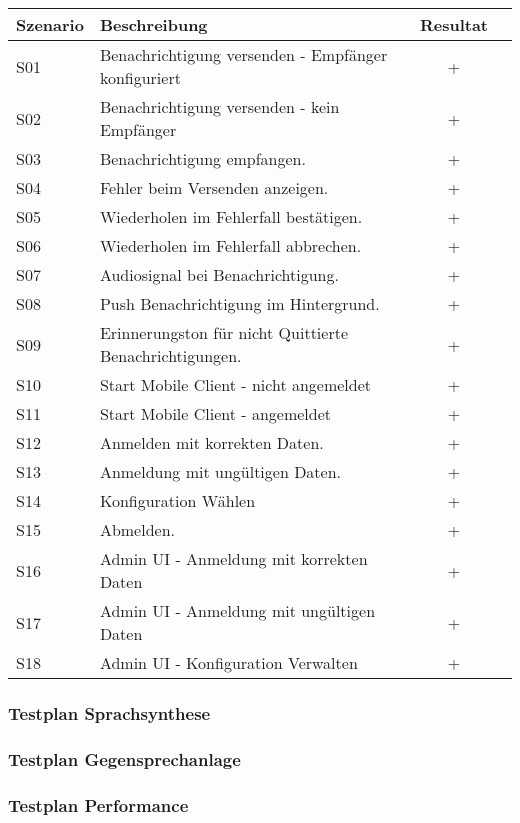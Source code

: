 \begin{table}[h]
    \centering
    \begin{tabular}{|l|p{11cm}|c|c|}
        \hline
        \textbf{Szenario} & \textbf{Beschreibung}                                                                                                                                  & \textbf{Resultat} \\
        \hline
        S01         & Benachrichtigung versenden - Empfänger konfiguriert   & +\\
        \hline
        S02         & Benachrichtigung versenden - kein Empfänger & +\\
        \hline
        S03         & Benachrichtigung empfangen.  & +\\
        \hline
        S04         & Fehler beim Versenden anzeigen.  & +\\
        \hline
        S05         & Wiederholen im Fehlerfall bestätigen.  & +\\
        \hline
        S06         & Wiederholen im Fehlerfall abbrechen.  & +\\
        \hline
        S07         & Audiosignal bei Benachrichtigung.   & +\\
        \hline
        S08         & Push Benachrichtigung im Hintergrund.  & +\\
        \hline
        S09         & Erinnerungston für nicht Quittierte Benachrichtigungen.   & +\\
        \hline
        S10         & Start Mobile Client - nicht angemeldet   & +\\
        \hline
        S11         & Start Mobile Client  - angemeldet & +\\
        \hline
        S12         & Anmelden mit korrekten Daten.   & +\\
        \hline
        S13         & Anmeldung mit ungültigen Daten.   & +\\
        \hline
        S14         & Konfiguration Wählen   & +\\
        \hline
        S15         & Abmelden.   & +\\
        \hline
        S16         & Admin UI - Anmeldung mit korrekten Daten   & +\\
        \hline
        S17         & Admin UI - Anmeldung mit ungültigen Daten   & +\\
        \hline
        S18         & Admin UI - Konfiguration Verwalten   & +\\
        \hline
    \end{tabular}\label{tab:testplan}
\end{table}
\clearpage

\subsubsection{Testplan Sprachsynthese}
\clearpage

\subsubsection{Testplan Gegensprechanlage}
\clearpage

\subsubsection{Testplan Performance}
\clearpage

